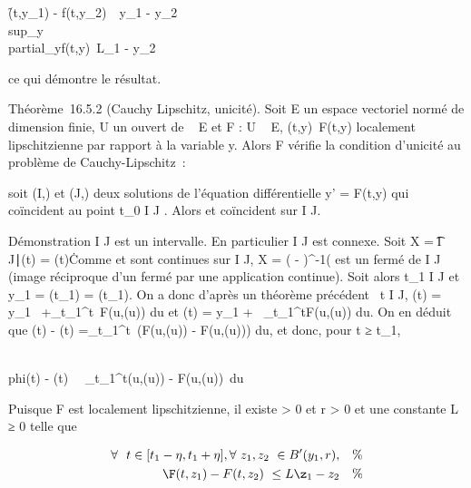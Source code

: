 \f(t,y_1) -
f(t,y_2)\ \leq\
y_1 -
y_2\\
sup_y\in[y_1,y_2]\\partial_yf(t,y)\
\leq L\y_1 -
y_2\

ce qui démontre le résultat.

Théorème~16.5.2 (Cauchy Lipschitz, unicité). Soit E un espace vectoriel
normé de dimension finie, U un ouvert de ~ \times E et F : U \rightarrow~ E,
(t,y)\mapsto~F(t,y) localement lipschitzienne par
rapport à la variable y. Alors F vérifie la condition d'unicité au
problème de Cauchy-Lipschitz~:

soit (I,\phi) et (J,\psi) deux solutions de l'équation différentielle y' =
F(t,y) qui coïncident au point t_0 \in I \bigcap J . Alors \phi et \psi
coïncident sur I \bigcap J.

Démonstration I \bigcap J est un intervalle. En particulier I \bigcap J est connexe.
Soit X = \t \in I \bigcap J∣\phi(t) =
\psi(t)\. Comme \phi et \psi sont continues sur I \bigcap J, X = (\phi
- \psi)^-1(\0\) est un fermé de
I \bigcap J (image réciproque d'un fermé par une application continue). Soit
alors t_1 \in I \bigcap J et y_1 = \phi(t_1) =
\psi(t_1). On a donc d'après un théorème précédent
\forall~t \in I \bigcap J, \phi(t) = y_1~
+\int  _t_1^t~F(u,\phi(u))
du et \psi(t) = y_1 +\int ~
_t_1^tF(u,\psi(u)) du. On en déduit que \phi(t) - \psi(t)
=\int  _t_1^t~(F(u,\phi(u))
- F(u,\psi(u))) du, et donc, pour t ≥ t_1,

\\phi(t) - \psi(t)\
\leq\int ~
_t_1^t\F(u,\phi(u)) -
F(u,\psi(u))\ du

Puisque F est localement lipschitzienne, il existe \eta > 0 et
r > 0 et une constante L ≥ 0 telle que

\begin{align*} \forall~~t \in
[t_1 - \eta,t_1 + \eta],
\forall~z_1,z_2~ \in
B'(y_1,r),& & \%& \\
\F(t,z_1) -
F(t,z_2)\ \leq
L\z_1 -
z_2& & \%&
\\ \end{align*}

